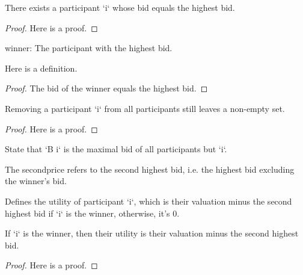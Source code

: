\begin{lemma}\label{exists_max}
    \leanok
    There exists a participant `i` whose bid equals the highest bid.
\end{lemma}
\begin{proof}
    Here is a proof.
\end{proof}


\begin{definition}\label{winner}
    \leanok
    winner: The participant with the highest bid.
\end{definition}

\begin{lemma}\label{winner_take_max}
    \leanok
    Here is a definition.
\end{lemma}
\begin{proof}
    The bid of the winner equals the highest bid.
\end{proof}

\begin{lemma}\label{delete_i_nonempty}
    \leanok
    Removing a participant `i` from all participants still leaves a non-empty set.
\end{lemma}
\begin{proof}
    Here is a proof.
\end{proof}

\begin{definition}\label{B}
    \leanok
    State that `B i` is the maximal bid of all participants but `i`.
\end{definition}

\begin{definition}\label{secondprice}
    \leanok
    The secondprice refers to the second highest bid, i.e. the highest bid excluding the winner’s bid.
\end{definition}

\begin{definition}\label{utility}
    \leanok
    Defines the utility of participant `i`, which is their valuation minus the second highest bid if `i` is the winner, otherwise, it's 0.
\end{definition}

\begin{lemma}\label{utility_winner}
    \leanok
    If `i` is the winner, then their utility is their valuation minus the second highest bid.
\end{lemma}
\begin{proof}
    Here is a proof.
\end{proof}


